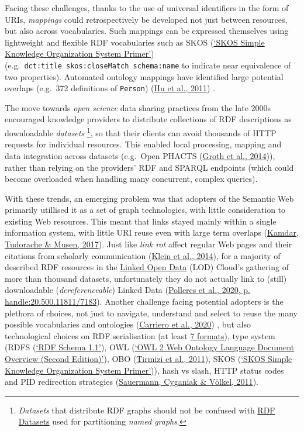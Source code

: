 Facing these challenges, thanks to the use of universal identifiers in the form of URIs, \emph{mappings} could retrospectively be developed not just between resources, but also across vocabularies. Such mappings can be expressed themselves using lightweight and flexible RDF vocabularies such as SKOS (\protect\hyperlink{ref-15gQDya5B}{{`SKOS Simple Knowledge Organization System Primer'}}) (e.g.~\texttt{dct:title\ skos:closeMatch\ schema:name} to indicate near equivalence of two properties). Automated ontology mappings have identified large potential overlaps (e.g.~372 definitions of \texttt{Person}) (\protect\hyperlink{ref-FDDmgO6s}{Hu et al., 2011}) .

The move towards \emph{open science} data sharing practices from the late 2000s encouraged knowledge providers to distribute collections of RDF descriptions as downloadable \emph{datasets} \footnote{\emph{Datasets} that distribute RDF graphs should not be confused with \href{https://www.w3.org/TR/rdf11-concepts/\#section-dataset}{RDF Datasets} used for partitioning \emph{named graphs}.}, so that their clients can avoid thousands of HTTP requests for individual resources. This enabled local processing, mapping and data integration across datasets (e.g.~Open PHACTS (\protect\hyperlink{ref-191ZkYZMt}{Groth et al., 2014})), rather than relying on the providers' RDF and SPARQL endpoints (which could become overloaded when handling many concurrent, complex queries).

With these trends, an emerging problem was that adopters of the Semantic Web primarily utillised it as a set of graph technologies, with little consideration to existing Web resources. This meant that links stayed mainly within a single information system, with little URI reuse even with large term overlaps (\protect\hyperlink{ref-9CdJnsoJ}{Kamdar, Tudorache \& Musen, 2017}). Just like \emph{link rot} affect regular Web pages and their citations from scholarly communication (\protect\hyperlink{ref-AGHR9oyr}{Klein et al., 2014}), for a majority of described RDF resources in the \href{https://lod-cloud.net/}{Linked Open Data} (LOD) Cloud's gathering of more than thousand datasets, unfortunately they do not actually link to (still) downloadable (\emph{dereferenceable}) Linked Data (\protect\hyperlink{ref-5SuwLNdE}{Polleres et al., 2020, p. handle:20.500.11811/7183}). Another challenge facing potential adopters is the plethora of choices, not just to navigate, understand and select to reuse the many possible vocabularies and ontologies (\protect\hyperlink{ref-TUmA4KQT}{Carriero et al., 2020}) , but also technological choices on RDF serialisation (at least \href{https://www.w3.org/TR/rdf11-primer/\#section-graph-syntax}{7 formats}), type system (RDFS (\protect\hyperlink{ref-ZwAcGQKY}{{`RDF Schema 1.1'}}), OWL (\protect\hyperlink{ref-1p4IWJpI}{{`OWL 2 Web Ontology Language Document Overview (Second Edition)'}}), OBO (\protect\hyperlink{ref-1DalZuKct}{Tirmizi et al., 2011}), SKOS (\protect\hyperlink{ref-15gQDya5B}{{`SKOS Simple Knowledge Organization System Primer'}})), hash vs slash, HTTP status codes and PID redirection strategies (\protect\hyperlink{ref-rnzJ4khD}{Sauermann, Cyganiak \& Völkel, 2011}).

